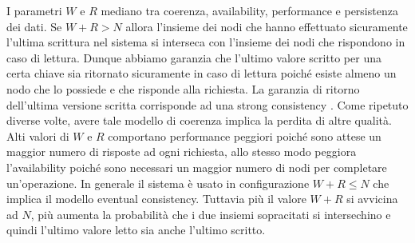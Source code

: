 \documentclass[twoside]{article}
\begin{document}
\begin{multicols}{2}
I parametri $W$ e $R$ mediano tra coerenza, availability, performance e persistenza dei dati. Se $W+R > N$ allora l'insieme dei nodi che hanno effettuato sicuramente l'ultima scrittura nel sistema si interseca con l'insieme dei nodi che rispondono in caso di lettura. Dunque abbiamo garanzia che l'ultimo valore scritto per una certa chiave sia ritornato sicuramente in caso di lettura poiché esiste almeno un nodo che lo possiede e che risponde alla richiesta. La garanzia di ritorno dell'ultima versione scritta corrisponde ad una strong consistency \cite{bib:vogels-blog}. Come ripetuto diverse volte, avere tale modello di coerenza implica la perdita di altre qualità. Alti valori di $W$ e $R$ comportano performance peggiori poiché sono attese un maggior numero di risposte ad ogni richiesta, allo stesso modo peggiora l'availability poiché sono necessari un maggior numero di nodi per completare un'operazione. In generale il sistema è usato in configurazione $W+R \leq N$ che implica il modello eventual consistency. Tuttavia più il valore $W+R$ si avvicina ad $N$, più aumenta la probabilità che i due insiemi sopracitati si intersechino e quindi l'ultimo valore letto sia anche l'ultimo scritto.


\end{multicols}
\end{document}
